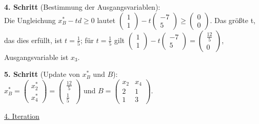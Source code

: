 \documentclass[10pt,a4paper,oneside,ngerman,numbers=noenddot]{scrartcl}
\begin{document}
		\textbf{4. Schritt} (Bestimmung der Ausgangsvariablen):\\
		Die Ungleichung $x_{B}^{*} - td \geq 0$ lautet $\begin{pmatrix} 1 \\ 1 \end{pmatrix} - t \begin{pmatrix}-7 \\ 5 \end{pmatrix} \geq \begin{pmatrix} 0 \\ 0  \end{pmatrix}$. Das größte t, das dies erfüllt, ist $t = \frac{1}{5}$; für $t = \frac{1}{5}$ gilt $\begin{pmatrix} 1 \\ 1\end{pmatrix} - t \begin{pmatrix} -7 \\ 5 \end{pmatrix} = \begin{pmatrix} \frac{12}{5} \\ 0 \end{pmatrix}$, Ausgangsvariable ist $x_{3}$.
		
		\textbf{5. Schritt} (Update von $x_{B}^{*}$ und $B$):\\
		$x_{B}^{*} = \begin{pmatrix} x_{2}^{*} \\ x_{4}^{*} \end{pmatrix} = \begin{pmatrix} \frac{12}{5} \\ \frac{1}{5} \end{pmatrix}$ und $B = \begin{pmatrix} x_{2} & x_{4} \\ 2 & 1 \\ 1 & 3 \end{pmatrix}$.
		
		\underline{4. Iteration}
		
\end{document}
